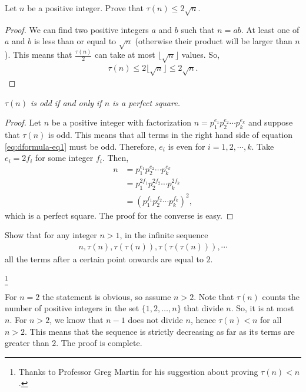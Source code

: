 \documentclass[12pt]{subfile}
\begin{document}
			\begin{theorem}\label{prop:tau(n)<2sqrt(n)}
				Let $n$ be a positive integer. Prove that $\tau(n) \leq 2 \sqrt n$.
			\end{theorem}

			\begin{proof}
				We can find two positive integers $a$ and $b$ such that $n=ab$. At least one of $a$ and $b$ is less than or equal to $\sqrt n$ (otherwise their product will be larger than $n$). This means that $\frac{\tau(n)}{2}$ can take at most $\lfloor \sqrt n \rfloor$ values. So,
					\begin{align*}
						\tau(n) \leq 2 \lfloor \sqrt n \rfloor \leq 2 \sqrt n.
					\end{align*}
			\end{proof}

			\begin{theorem}\slshape
				$\tau(n)$ is odd if and only if $n$ is a perfect square.
			\end{theorem}

			\begin{proof}
				Let $n$ be a positive integer with factorization $n=p_1^{e_1}p_2^{e_2}\cdots p_k^{e_k}$ and suppose that $\tau(n)$ is odd. This means that all terms in the right hand side of equation \ref{eq:dformula-eq1} must be odd. Therefore, $e_i$ is even for $i=1,2,\cdots,k$. Take $e_i = 2f_i$ for some integer $f_i$. Then,
					\begin{align*}
						n &= p_1^{e_1}p_2^{e_2}\cdots p_k^{e_k}\\
						&= p_1^{2f_1}p_2^{2f_2}\cdots p_k^{2f_k}\\
						&= \left(p_1^{f_1}p_2^{f_2}\cdots p_k^{f_k}\right)^2,
					\end{align*}
				which is a perfect square. The proof for the converse is easy.
			\end{proof}

			\begin{problem}
				Show that for any integer $n>1$, in the infinite sequence
					\begin{align*}
						n, \tau(n), \tau(\tau(n)), \tau(\tau(\tau(n))),\cdots
					\end{align*}
				all the terms after a certain point onwards are equal to $2$. %
			\end{problem}

			\begin{solution}\footnote{Thanks to Professor Greg Martin for his suggestion about proving $\tau(n)<n$.}

				For $n=2$ the statement is obvious, so assume $n >2$. Note that $\tau(n)$ counts the number of positive integers in the set $\{1,2,\ldots,n\}$ that divide $n$. So, it is at most $n$. For $n>2$, we know that $n-1$ does not divide $n$,  hence $\tau(n) < n$ for all $n>2$. This means that the sequence is strictly decreasing as far as its terms are greater than $2$. The proof is complete.
			\end{solution}
\end{document}
